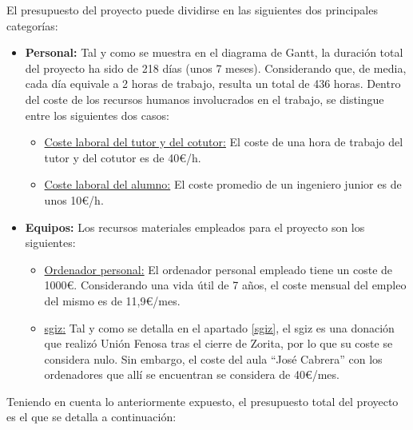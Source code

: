     El presupuesto del proyecto puede dividirse en las siguientes dos principales categorías:

    \begin{itemize}
      \item \textbf{Personal:} Tal y como se muestra en el diagrama de Gantt, la duración total del proyecto ha sido de 218 días (unos 7 meses). Considerando que, de media, cada día equivale a 2 horas de trabajo, resulta un total de 436 horas. Dentro del coste de los recursos humanos involucrados en el trabajo, se distingue entre los siguientes dos casos:
      \begin{itemize}
        \item \underline{Coste laboral del tutor y del cotutor:} El coste de una hora de trabajo del tutor y del cotutor es de 40€/h.
        \item \underline{Coste laboral del alumno:} El coste promedio de un ingeniero junior es de unos 10€/h.
      \end{itemize} 
      \item \textbf{Equipos:} Los recursos materiales empleados para el proyecto son los siguientes:
      \begin{itemize}
        \item \underline{Ordenador personal:} El ordenador personal empleado tiene un coste de 1000€. Considerando una vida útil de 7 años, el coste mensual del empleo del mismo es de 11,9€/mes.
        \item \underline{\acrfull{sgiz}:} Tal y como se detalla en el apartado \ref{sgiz}, el \acrshort{sgiz} es una donación que realizó Unión Fenosa tras el cierre de Zorita, por lo que su coste se considera nulo. Sin embargo, el coste del aula ``José Cabrera'' con los ordenadores que allí se encuentran se considera de 40€/mes.
      \end{itemize}
    \end{itemize}
    
    Teniendo en cuenta lo anteriormente expuesto, el presupuesto total del proyecto es el que se detalla a continuación:
    
